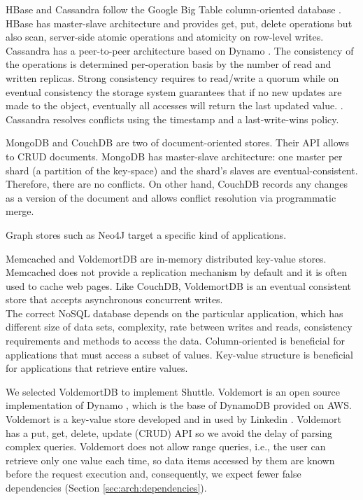 HBase and Cassandra follow the Google Big Table column-oriented database \cite{Chang2008}. HBase has master-slave architecture and provides get, put, delete operations but also scan, server-side atomic operations and atomicity on row-level writes. Cassandra has a peer-to-peer architecture based on Dynamo \cite{Decandia2007}. The consistency of the operations is determined per-operation basis by the number of read and written replicas. Strong consistency requires to read/write a quorum while on eventual consistency the storage system guarantees that if no new updates are made to the object, eventually all accesses will return the last updated value. \cite{Decandia2007}. Cassandra resolves conflicts using the timestamp and a last-write-wins policy. 

MongoDB and CouchDB are two of document-oriented stores. Their \ac{API} allows to \ac{CRUD} documents. MongoDB has master-slave architecture: one master per shard (a partition of the key-space) and the shard's slaves are eventual-consistent. Therefore, there are no conflicts. On other hand, CouchDB records any changes as a version of the document and allows conflict resolution via programmatic merge. 

Graph stores such as Neo4J target a specific kind of applications.

Memcached and VoldemortDB are in-memory distributed key-value stores. Memcached does not provide a replication mechanism by default and it is often used to cache web pages. Like CouchDB, VoldemortDB is an eventual consistent store that accepts asynchronous concurrent writes.\\

The correct \acs{NoSQL} database depends on the particular application, which has different size of data sets, complexity, rate between writes and reads, consistency requirements and methods to access the data. Column-oriented is beneficial for applications that must access a subset of values. Key-value structure is beneficial for applications that retrieve entire values. 

We selected VoldemortDB \cite{Kreps} to implement Shuttle. Voldemort is an open source implementation of Dynamo \cite{Decandia2007}, which is the base of DynamoDB provided on \ac{AWS}. Voldemort is a key-value store developed and in used by Linkedin \cite{linkedin}. Voldemort has a put, get, delete, update (\ac{CRUD}) \ac{API} so we avoid the delay of parsing complex queries. Voldemort does not allow range queries, i.e., the user can retrieve only one value each time, so data items accessed by them are known before the request execution and, consequently, we expect fewer false dependencies (Section \ref{sec:arch:dependencies}). 


